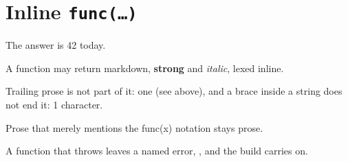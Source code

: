 \section{Inline \texttt{func(…)}}

The answer is 42 today.

A function may return markdown, \textbf{strong} and \emph{italic}, lexed inline.

Trailing prose is not part of it: one (see above), and a brace
inside a string does not end it: 1 character.

Prose that merely mentions the func(x) notation stays prose.

A function that throws leaves a named error, , and
the build carries on.

